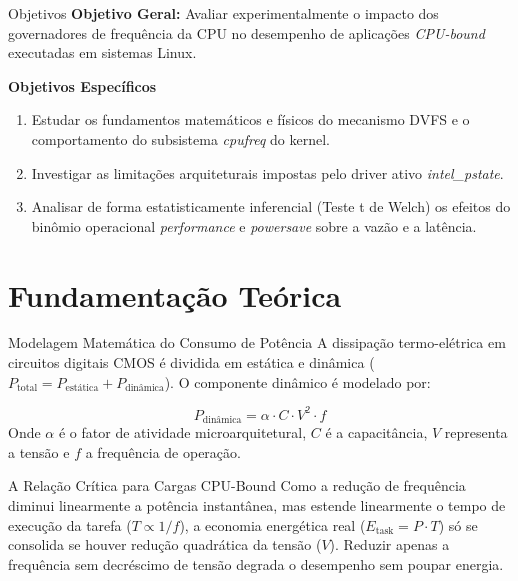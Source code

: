 \documentclass[aspectratio=169,10pt]{beamer}
\begin{document}
\begin{frame}{Objetivos}
    \textbf{Objetivo Geral:} Avaliar experimentalmente o impacto dos governadores de frequência da CPU no desempenho de aplicações \textit{CPU-bound} executadas em sistemas Linux.
    
    \vspace{0.5cm}
    
    \textbf{Objetivos Específicos}
    
    \begin{enumerate}
        \item Estudar os fundamentos matemáticos e físicos do mecanismo DVFS e o comportamento do subsistema \textit{cpufreq} do kernel.
        \item Investigar as limitações arquiteturais impostas pelo driver ativo \textit{intel\_pstate}.
        \item Analisar de forma estatisticamente inferencial (Teste t de Welch) os efeitos do binômio operacional \textit{performance} e \textit{powersave} sobre a vazão e a latência.
    \end{enumerate}
\end{frame}


\section{Fundamentação Teórica}

\begin{frame}{Modelagem Matemática do Consumo de Potência}
    A dissipação termo-elétrica em circuitos digitais CMOS é dividida em estática e dinâmica ($P_{\text{total}} = P_{\text{estática}} + P_{\text{dinâmica}}$). O componente dinâmico é modelado por:
    
    \begin{equation}
        P_{\text{dinâmica}} = \alpha \cdot C \cdot V^2 \cdot f
        \label{eq:potencia}
    \end{equation}
    Onde $\alpha$ é o fator de atividade microarquitetural, $C$ é a capacitância, $V$ representa a tensão e $f$ a frequência de operação.

    \begin{block}{A Relação Crítica para Cargas CPU-Bound}
        Como a redução de frequência diminui linearmente a potência instantânea, mas estende linearmente o tempo de execução da tarefa ($T \propto 1/f$), a economia energética real ($E_{\text{task}} = P \cdot T$) só se consolida se houver redução quadrática da tensão ($V$). Reduzir apenas a frequência sem decréscimo de tensão degrada o desempenho sem poupar energia.
    \end{block}
\end{frame}
\end{document}
